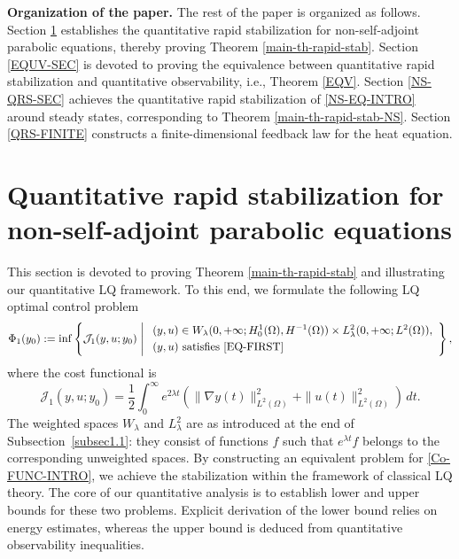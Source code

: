 \documentclass[a4paper]{article}
\numberwithin{equation}{section}
\begin{document}
\noindent \textbf{Organization of the paper.}
The rest of the paper is organized as follows. Section \ref{QRS-INF} establishes the quantitative rapid stabilization for non-self-adjoint parabolic equations, thereby proving Theorem \ref{main-th-rapid-stab}. Section \ref{EQUV-SEC} is devoted to proving the equivalence between quantitative rapid stabilization and quantitative observability,  i.e., Theorem \ref{EQV}. Section \ref{NS-QRS-SEC} achieves the quantitative rapid stabilization of \eqref{NS-EQ-INTRO} around steady states, corresponding to Theorem \ref{main-th-rapid-stab-NS}. Section \ref{QRS-FINITE} constructs a finite-dimensional feedback law for the heat equation.

\section{Quantitative rapid stabilization for non-self-adjoint parabolic equations}\label{QRS-INF}

This section is devoted to proving Theorem \ref{main-th-rapid-stab} and illustrating our quantitative LQ framework. To this end, we formulate the following LQ optimal control problem 
\begin{equation}\label{Co-FUNC-INTRO}
\Phi_1(y_0):= {\inf}\left\{\mathcal J_1(y,u;y_0)\;\middle|\; 
\begin{array}{l}
(y,u)\in W_{{\lambda }}(0,+\infty;H_0^1(\Omega),H^{-1}(\Omega))\times L^2_{\lambda}(0,+\infty;L^2(\Omega)),\\[1mm]
(y,u)\ \text{satisfies \eqref{EQ-FIRST}}
\end{array}\right\},
\end{equation}
where the cost functional is
\begin{equation}\label{cost-infiite-intro}
\mathcal J_1(y,u;y_0)=\frac12\int_0^\infty e^{2\lambda t}\left(\|\nabla y(t)\|_{L^2(\Omega)}^2+\|u(t)\|_{L^2(\Omega)}^2\right)\,dt.
\end{equation}
The weighted spaces $W_{\lambda}$ and $L^2_{\lambda}$ are as introduced at the end of Subsection~\ref{subsec1.1}: they consist of functions $f$ such that $e^{\lambda t}f$ belongs to the corresponding unweighted spaces. By constructing an equivalent problem for \eqref{Co-FUNC-INTRO}, we achieve the stabilization within the framework of classical LQ theory. The core of our quantitative analysis is to establish lower and upper bounds for these two problems. Explicit derivation of the lower bound relies on energy estimates, whereas the upper bound is deduced from quantitative observability inequalities.\\[-2mm]
\end{document}
